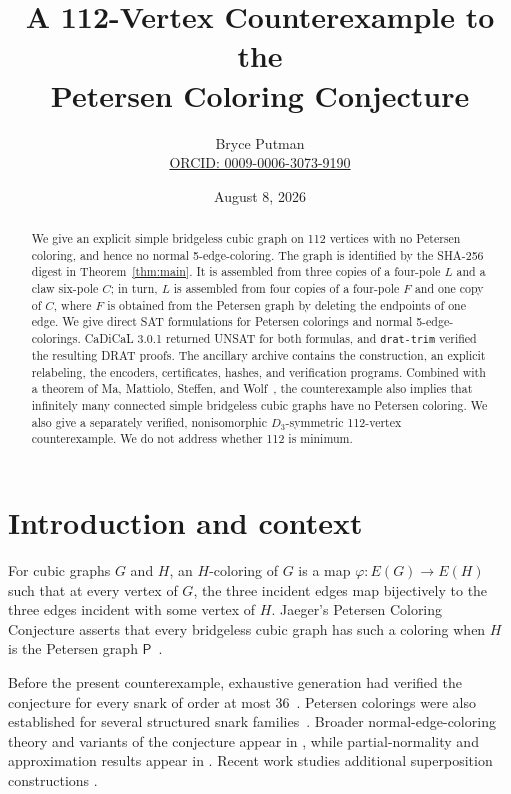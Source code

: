 \documentclass[11pt]{article}
\title{A 112-Vertex Counterexample to the\\Petersen Coloring Conjecture}
\author{Bryce Putman\\
\small\href{https://orcid.org/0009-0006-3073-9190}{ORCID: 0009-0006-3073-9190}}
\date{August 8, 2026}
\newcommand{\Petersen}{\mathsf P}
\begin{document}
\maketitle

\begin{abstract}
We give an explicit simple bridgeless cubic graph on 112 vertices with no
Petersen coloring, and hence no normal 5-edge-coloring.  The graph is
identified by the SHA-256 digest in Theorem~\ref{thm:main}.  It is assembled
from three copies of a four-pole \(L\) and a claw six-pole \(C\); in turn,
\(L\) is assembled from four copies of a four-pole \(F\) and one copy of
\(C\), where \(F\) is obtained from the Petersen graph by deleting the
endpoints of one edge.  We give direct SAT formulations for Petersen
colorings and normal 5-edge-colorings.  CaDiCaL 3.0.1 returned UNSAT
for both formulas, and \texttt{drat-trim} verified the resulting DRAT proofs.
The ancillary archive contains the construction, an explicit relabeling, the
encoders, certificates, hashes, and verification programs.  Combined with a
theorem of Ma, Mattiolo, Steffen, and Wolf~\cite{MaEtAl2025}, the counterexample
also implies that infinitely many connected simple bridgeless cubic graphs have
no Petersen coloring.  We also give a separately verified, nonisomorphic
\(D_3\)-symmetric 112-vertex counterexample.  We do not address whether 112 is
minimum.
\end{abstract}

\section{Introduction and context}

For cubic graphs \(G\) and \(H\), an \(H\)-coloring of \(G\) is a map
\(\varphi:E(G)\to E(H)\) such that at every vertex of \(G\), the three
incident edges map bijectively to the three edges incident with some vertex of
\(H\).  Jaeger's Petersen Coloring Conjecture asserts that every bridgeless
cubic graph has such a coloring when \(H\) is the Petersen graph
\(\Petersen\)~\cite{Jaeger1988}.

Before the present counterexample, exhaustive generation had verified the
conjecture for every snark of order at most 36~\cite{BrinkmannEtAl2013}.
Petersen colorings were also established for several structured snark
families~\cite{HaggSteffen2014,FerrariniEtAl2020}.  Broader normal-edge-coloring
theory and variants of the conjecture appear in
\cite{MazzuoccoloMkrtchyan2020,PirotEtAl2020}, while partial-normality and
approximation results appear in \cite{JinKang2021,MattioloEtAl2021}.
Recent work studies additional superposition constructions
\cite{SedlarSkrekovski2024a,SedlarSkrekovski2024b,SedlarSkrekovski2023,ZhouEtAl2026}.
\end{document}
